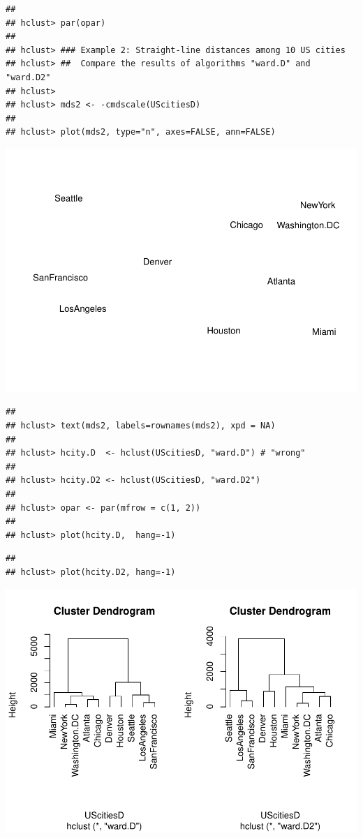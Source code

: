 \documentclass[
]{book}
\begin{document}
\begin{verbatim}
## 
## hclust> par(opar)
## 
## hclust> ### Example 2: Straight-line distances among 10 US cities
## hclust> ##  Compare the results of algorithms "ward.D" and "ward.D2"
## hclust> 
## hclust> mds2 <- -cmdscale(UScitiesD)
## 
## hclust> plot(mds2, type="n", axes=FALSE, ann=FALSE)
\end{verbatim}

\includegraphics{bookdown-demo_files/figure-latex/unnamed-chunk-12-4.pdf}

\begin{verbatim}
## 
## hclust> text(mds2, labels=rownames(mds2), xpd = NA)
## 
## hclust> hcity.D  <- hclust(UScitiesD, "ward.D") # "wrong"
## 
## hclust> hcity.D2 <- hclust(UScitiesD, "ward.D2")
## 
## hclust> opar <- par(mfrow = c(1, 2))
## 
## hclust> plot(hcity.D,  hang=-1)
\end{verbatim}

\begin{verbatim}
## 
## hclust> plot(hcity.D2, hang=-1)
\end{verbatim}

\includegraphics{bookdown-demo_files/figure-latex/unnamed-chunk-12-5.pdf}
\end{document}
